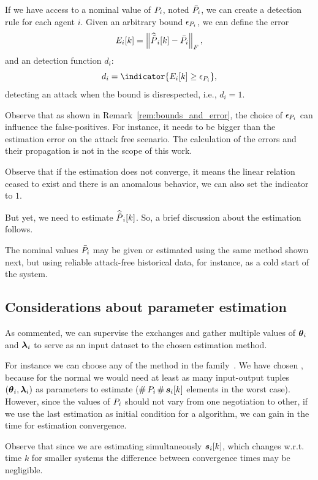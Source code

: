 \documentclass[../main.tex]{subfiles}
\begin{document}
If we have access to a nominal value of ${P}_{i}$, noted $\bar{{P}}_{i}$, we can create a detection rule for each agent $i$.
Given an arbitrary bound $\epsilon_{{P}_{i}}$, we can define the error
\begin{equation}
  E_{i}[k] =\left\lVert\widehat{\tilde{P}}_{i}[k]-\bar{{P}}_{i}\right\rVert_{F},
\end{equation}
and an detection function $d_{i}$:
\begin{equation}
  d_{i}=\indicator{E_{i}[k]\geq\epsilon_{\Plin}},
\end{equation}
detecting an attack when the bound is disrespected, i.e., $d_{i}=1$.
\begin{remark}
  Observe that as shown in Remark~\ref{rem:bounds_and_error}, the choice of $\epsilon_{{P}_{i}}$ can influence the false-positives.
  For instance, it needs to be bigger than the estimation error on the attack free scenario.
  The calculation of the errors and their propagation is not in the scope of this work.
\end{remark}

\begin{remark}
  Observe that if the estimation does not converge, it means the linear relation ceased to exist and there is an anomalous behavior, we can also set the indicator to $1$.
\end{remark}

But yet, we need to estimate $\widehat{\tilde{P}}_{i}[k]$.
So, a brief discussion about the estimation follows.

\begin{remark}
  The nominal values $\bar{{P}}_{i}$ may be given or estimated using the same method shown next, but using reliable attack-free historical data, for instance, as a cold start of the system.
\end{remark}

\subsection{Considerations about parameter estimation}\label{sec:about-estimation}
As commented, we can supervise the exchanges and gather multiple values of $\boldsymbol{\theta}_{i}$ and $\boldsymbol{\lambda}_{i}$ to serve as an input dataset to the chosen estimation method.

For instance we can choose any of the method in the \LS{} family~\cite{AstroemWittenmark1989}.
We have chosen \RLS{}, because for the normal \LS{} we would need at least as many input-output tuples $(\boldsymbol{\theta}_{i},\boldsymbol{\lambda}_{i})$ as parameters to estimate ($\operatorname{\#}{P}_{i}\operatorname{\#}\boldsymbol{s}_{i}[k]$ elements in the worst case).
However, since the values of ${P}_{i}$ should not vary from one negotiation to other, if we use the last estimation as initial condition for a \RLS{} algorithm, we can gain in the time for estimation convergence.
\begin{remark}
  Observe that since we are estimating simultaneously $\boldsymbol{s}_{i}[k]$, which changes w.r.t. time $k$ for smaller systems the difference between convergence times may be negligible.
\end{remark}
\end{document}
